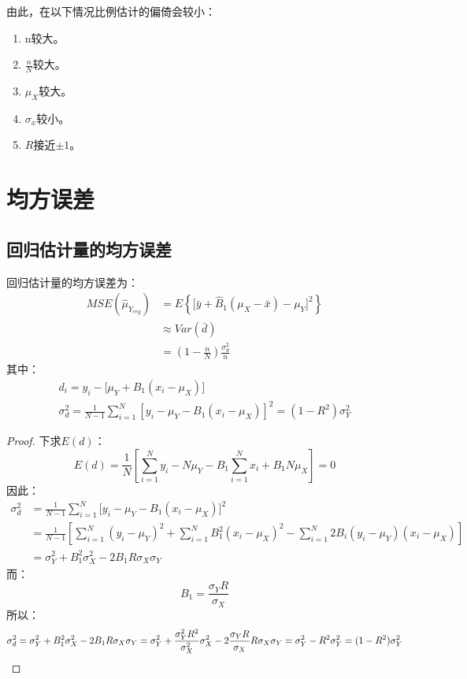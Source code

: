 由此，在以下情况比例估计的偏倚会较小：
\begin{enumerate}
	\item n较大。
	\item $\frac{n}{N}$较大。
	\item $\mu_X$较大。
	\item $\sigma_x$较小。
	\item $R$接近$\pm 1$。
\end{enumerate}
\section{均方误差}

\subsection{回归估计量的均方误差}
\begin{theorem}
	回归估计量的均方误差为：
	\begin{align*}
		MSE(\hat{\mu}_{Y_{reg}})&= 
		E\left\lbrace\big[\bar{y}+\hat{B}_1(\mu_X-\bar{x})-\mu_Y\big]^2\right\rbrace  \\
		&\approx Var(\bar{d}) \\
		&=\left(1-\frac{n}{N}\right)\frac{\sigma_d^2}{n}
	\end{align*}
	其中：
	\begin{gather*}
		d_i=y_i-\big[\mu_Y+B_1(x_i-\mu_X)\big] \\
		\sigma_d^2=\frac{1}{N-1}\sum_{i=1}^N[y_i-\mu_Y-B_1(x_i-\mu_X)]^2=(1-R^2)\sigma_Y^2
	\end{gather*}
\end{theorem}
\begin{proof}
	下求$E(d)$：
	\begin{equation*}
		E(d)=\frac{1}{N}\left[\sum_{i=1}^Ny_i-N\mu_Y-B_1\sum_{i=1}^Nx_i+B_1N\mu_X\right]=0
	\end{equation*}
	因此：
	\begin{align*}
		\sigma_d^2&=\frac{1}{N-1}\sum_{i=1}^N\big[y_i-\mu_Y-B_1(x_i-\mu_X)\big]^2 \\
		&=\frac{1}{N-1}\left[\sum_{i=1}^N(y_i-\mu_Y)^2+\sum_{i=1}^NB_1^2(x_i-\mu_X)^2-\sum_{i=1}^N2B_i(y_i-\mu_Y)(x_i-\mu_X)\right] \\
		&=\sigma_Y^2+B_1^2\sigma_X^2-2B_1R\sigma_X\sigma_Y
	\end{align*}
	而：
	\begin{equation*}
		B_1=\frac{\sigma_YR}{\sigma_X}
	\end{equation*}
	所以：
	\begin{equation*}
		\sigma_d^2
		=\sigma_Y^2+B_1^2\sigma_X^2-2B_1R\sigma_X\sigma_Y 
		=\sigma_Y^2+\frac{\sigma_Y^2R^2}{\sigma_X^2}\sigma_X^2-2\frac{\sigma_YR}{\sigma_X}R\sigma_X\sigma_Y
		=\sigma_Y^2-R^2\sigma_Y^2
		=(1-R^2)\sigma_Y^2\qedhere
	\end{equation*}
\end{proof}

